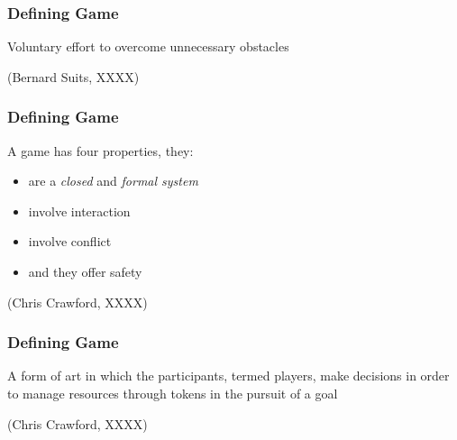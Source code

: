 \begin{frame}
	\frametitle{Defining Game}
		
	\begin{center}
	\begin{huge}
	Voluntary effort to overcome unnecessary obstacles
	\end{huge}
	
	\vspace{3em}
	
	(Bernard Suits, XXXX)
	\end{center}

\end{frame}

\begin{frame}
	\frametitle{Defining Game}
		
	\begin{large}
	A game has four properties, they:
	
	\begin{itemize}
		\item are a \textit{closed} and \textit{formal system}
		\item involve interaction
		\item involve conflict
		\item and they offer safety
	\end{itemize}
	
	\end{large}
	
	\vspace{3em}
	
	\begin{center}
	(Chris Crawford, XXXX)
	\end{center}

\end{frame}

\begin{frame}
	\frametitle{Defining Game}
		
	\begin{center}
	\begin{huge}
	A form of art in which the participants, termed players, make decisions in order to manage resources through tokens in the pursuit of a goal
	\end{huge}
	
	\vspace{3em}
	
	(Chris Crawford, XXXX)
	\end{center}

\end{frame}


